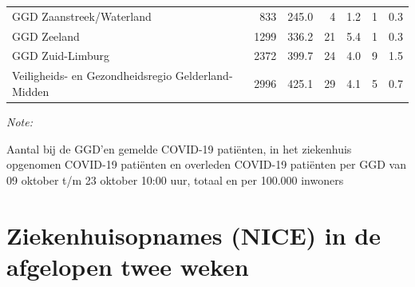 \documentclass[
  english,
  man,floatsintext]{apa6}
\begin{document}
\begin{table}
\begin{threeparttable}
\begin{tabular}{lrrrrrr}
GGD Zaanstreek/Waterland & 833 & 245.0 & 4 & 1.2 & 1 & 0.3\\
GGD Zeeland & 1299 & 336.2 & 21 & 5.4 & 1 & 0.3\\
GGD Zuid-Limburg & 2372 & 399.7 & 24 & 4.0 & 9 & 1.5\\
Veiligheids- en Gezondheidsregio Gelderland-Midden & 2996 & 425.1 & 29 & 4.1 & 5 & 0.7\\
\bottomrule
\end{tabular}
\begin{tablenotes}
\item \textit{Note: } 
\item Aantal bij de GGD’en gemelde COVID-19 patiënten, in het ziekenhuis opgenomen COVID-19 patiënten en overleden COVID-19 patiënten per GGD van 09 oktober t/m 23 oktober 10:00 uur, totaal en per 100.000 inwoners
\end{tablenotes}
\end{threeparttable}
\endgroup{}
\end{table}

\newpage

\hypertarget{ziekenhuisopnames-nice-in-de-afgelopen-twee-weken}{%
\section{Ziekenhuisopnames (NICE) in de afgelopen twee weken}\label{ziekenhuisopnames-nice-in-de-afgelopen-twee-weken}}
\end{document}
